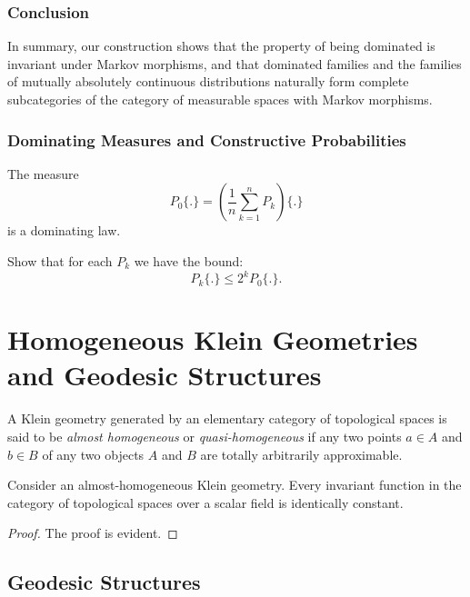\subsubsection{Conclusion}

In summary, our construction shows that the property of being dominated is invariant under Markov morphisms, and that dominated families and the families of mutually absolutely continuous distributions naturally form complete subcategories of the category of measurable spaces with Markov morphisms.


\subsubsection{Dominating Measures and Constructive Probabilities}

\begin{lemma}
    The measure 
    \[
    P_0\{.\} = \left(\frac{1}{n} \sum_{k=1}^n P_k\right) \{.\}
    \]
    is a dominating law.
\end{lemma}
\begin{ex}\label{Ex:LemmaDom}
Show that for each $P_k$ we have the bound: 
    \[
    P_k\{.\} \leq 2^k P_0\{.\}.
    \]

\end{ex}

\section{Homogeneous Klein Geometries and Geodesic Structures}

\begin{definition}
    A Klein geometry generated by an elementary category of topological spaces is said to be \textit{almost homogeneous} or \textit{quasi-homogeneous} if any two points $a \in A$ and $b \in B$ of any two objects $A$ and $B$ are totally arbitrarily approximable.
\end{definition}

\begin{lemma}
    Consider an almost-homogeneous Klein geometry. Every invariant function in the category of topological spaces over a scalar field is identically constant.
\end{lemma}

\begin{proof}
    The proof is evident.
\end{proof}

\subsection{Geodesic Structures}

